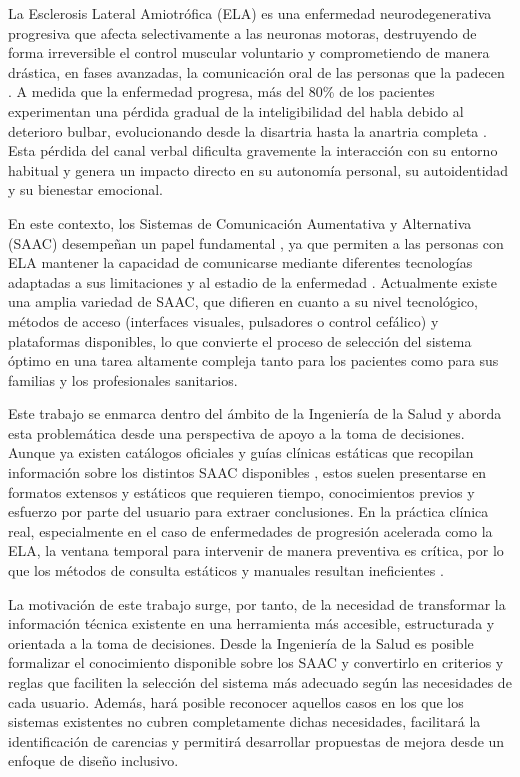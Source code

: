 
La Esclerosis Lateral Amiotrófica (ELA) es una enfermedad neurodegenerativa progresiva que afecta selectivamente a las neuronas motoras, destruyendo de forma irreversible el control muscular voluntario y comprometiendo de manera drástica, en fases avanzadas, la comunicación oral de las personas que la padecen \cite{startstemcells:als}. A medida que la enfermedad progresa, más del 80\% de los pacientes experimentan una pérdida gradual de la inteligibilidad del habla debido al deterioro bulbar, evolucionando desde la disartria hasta la anartria completa \cite{cave2021voice}. Esta pérdida del canal verbal dificulta gravemente la interacción con su entorno habitual y genera un impacto directo en su autonomía personal, su autoidentidad y su bienestar emocional.

En este contexto, los Sistemas de Comunicación Aumentativa y Alternativa (SAAC) desempeñan un papel fundamental \cite{plenainclusion:saac}, ya que permiten a las personas con ELA mantener la capacidad de comunicarse mediante diferentes tecnologías adaptadas a sus limitaciones y al estadio de la enfermedad \cite{pmc2025stage}. Actualmente existe una amplia variedad de SAAC, que difieren en cuanto a su nivel tecnológico, métodos de acceso (interfaces visuales, pulsadores o control cefálico) y plataformas disponibles, lo que convierte el proceso de selección del sistema óptimo en una tarea altamente compleja tanto para los pacientes como para sus familias y los profesionales sanitarios.

Este trabajo se enmarca dentro del ámbito de la Ingeniería de la Salud y aborda esta problemática desde una perspectiva de apoyo a la toma de decisiones. Aunque ya existen  catálogos oficiales y guías clínicas estáticas que recopilan información sobre los distintos SAAC disponibles \cite{ceapat:productos, elaandalucia:guia}, estos suelen presentarse en formatos extensos y estáticos que requieren tiempo, conocimientos previos y esfuerzo por parte del usuario para extraer conclusiones. En la práctica clínica real, especialmente en el caso de enfermedades de progresión acelerada como la ELA, la ventana temporal para intervenir de manera preventiva es crítica, por lo que los métodos de consulta estáticos y manuales resultan ineficientes \cite{taylor2026timing}.

La motivación de este trabajo surge, por tanto, de la necesidad de transformar la información técnica existente en una herramienta más accesible, estructurada y orientada a la toma de decisiones. Desde la Ingeniería de la Salud es posible formalizar el conocimiento disponible sobre los SAAC y convertirlo en criterios y reglas que faciliten la selección del sistema más adecuado según las necesidades de cada usuario. Además, hará posible reconocer aquellos casos en los que los sistemas existentes no cubren completamente dichas necesidades, facilitará la identificación de carencias y  permitirá desarrollar propuestas de mejora desde un enfoque de diseño inclusivo.

